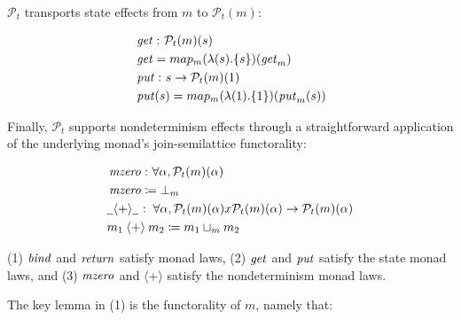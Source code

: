 $ \mathcal{P}  _t $ transports state effects from $m$ to
$ \mathcal{P}  _t (m)$:

\small\begin{align*}
&\hspace{0em}  \operatorname{\mathit{get}}   \mathbin{\colon}   \mathcal{P}  _t (m)(s) \\
&\hspace{0em}  \operatorname{\mathit{get}}  = map _m ( \lambda (s). \{ s \} ) (\operatorname{\mathit{get}} _m  ) \\
&\hspace{0em}  \operatorname{\mathit{put}}   \mathbin{\colon}  s  \rightarrow   \mathcal{P}  _t (m)(1) \\
&\hspace{0em}  \operatorname{\mathit{put}}( s) = map _m ( \lambda (1). \{ 1 \} ) (\operatorname{\mathit{put}} _m  (s))
\end{align*}\normalsize

Finally, $ \mathcal{P}  _t $ supports nondeterminism effects through a
straightforward application of the underlying monad's join-semilattice
functorality:

\small\begin{align*}
&\hspace{0em}  \operatorname{\mathit{mzero}}   \mathbin{\colon}   \forall   \alpha ,  \mathcal{P}  _t (m)( \alpha ) \\
&\hspace{0em}  \operatorname{\mathit{mzero}}   \coloneqq   \bot  _m  \\
&\hspace{0em}  \underline{\hspace{0.5em}}{  \mathbin{\langle + \rangle}  }\underline{\hspace{0.5em}}   \mathbin{\colon}   \forall   \alpha ,  \mathcal{P}  _t (m)( \alpha ) x  \mathcal{P}  _t (m)( \alpha )  \rightarrow   \mathcal{P}  _t (m)( \alpha ) \\
&\hspace{0em} m _1   \mathbin{\langle + \rangle}  m _2   \coloneqq  m _1   \sqcup  _m  m _2 
\end{align*}\normalsize

\par

\begin{proposition} (1) $ \operatorname{\mathit{bind}} $ and $ \operatorname{\mathit{return}} $ satisfy
monad laws, (2) $ \operatorname{\mathit{get}} $ and $ \operatorname{\mathit{put}} $ satisfy the state
monad laws, and (3) $ \operatorname{\mathit{mzero}} $ and $ \mathbin{\langle + \rangle} $
satisfy the nondeterminism monad laws. \end{proposition} The key lemma
in (1) is the functorality of $m$, namely that:

